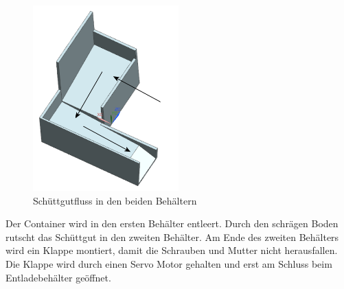 \begin{figure}[H]
\centering
\includegraphics[width=0.5\textwidth]{03_Loesungskonzept/pictures/behaelter.png}
\caption{Schüttgutfluss in den beiden Behältern}
\end{figure}\flushleft
Der Container wird in den ersten Behälter entleert. Durch den schrägen Boden rutscht das Schüttgut in den zweiten Behälter. Am Ende des zweiten Behälters wird ein Klappe montiert, damit die Schrauben und Mutter nicht herausfallen. Die Klappe wird durch einen Servo Motor gehalten und erst am Schluss beim Entladebehälter geöffnet.\\[0.2cm]

